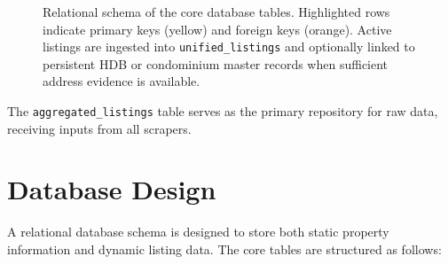 \begin{figure}[!ht]
{%
} %
\caption[Relational schema of the core database tables.]{Relational schema of the core database tables.
Highlighted rows indicate primary keys (\colorbox{yellow!30}{yellow})
and foreign keys (\colorbox{orange!20}{orange}).
Active listings are ingested into \texttt{unified\_listings} and
optionally linked to persistent HDB or condominium master records
when sufficient address evidence is available.}
\label{fig:er_diagram}
\end{figure}

The \texttt{aggregated\_listings} table serves as the primary repository for raw data, receiving inputs from all scrapers.

\section{Database Design}

A relational database schema is designed to store both static property information and dynamic listing data. The core tables are structured as follows:

